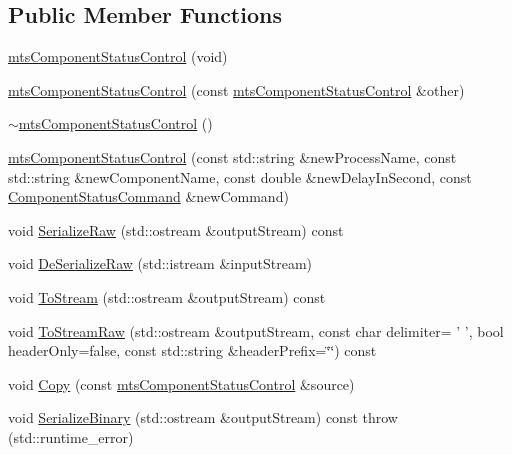 \subsection*{Public Member Functions}
\begin{DoxyCompactItemize}
\item 
\hyperlink{classmts_component_status_control_a4a0eb4df876169e6dbdd0d822362d8fe}{mts\-Component\-Status\-Control} (void)
\item 
\hyperlink{classmts_component_status_control_a1b81428cfe551fc765f40b0081424f1a}{mts\-Component\-Status\-Control} (const \hyperlink{classmts_component_status_control}{mts\-Component\-Status\-Control} \&other)
\item 
\hyperlink{classmts_component_status_control_a326a6e23cf95c0be12787c2400fd63a8}{$\sim$mts\-Component\-Status\-Control} ()
\item 
\hyperlink{classmts_component_status_control_abae2a8ef219b86843c51a5420e12fe4b}{mts\-Component\-Status\-Control} (const std\-::string \&new\-Process\-Name, const std\-::string \&new\-Component\-Name, const double \&new\-Delay\-In\-Second, const \hyperlink{classmts_component_status_control_aaa1cc592d13ddd45a5cf695f72d3511f}{Component\-Status\-Command} \&new\-Command)
\item 
void \hyperlink{classmts_component_status_control_a08061e2b13e950ad1808c52ca9d2b6eb}{Serialize\-Raw} (std\-::ostream \&output\-Stream) const 
\item 
void \hyperlink{classmts_component_status_control_a6b3b0363d79317544aa2e24106b65c74}{De\-Serialize\-Raw} (std\-::istream \&input\-Stream)
\item 
void \hyperlink{classmts_component_status_control_a203ad251c8d802a2528587accdccd47b}{To\-Stream} (std\-::ostream \&output\-Stream) const 
\item 
void \hyperlink{classmts_component_status_control_a2aaf608f7b087a267a29930951bdd1e9}{To\-Stream\-Raw} (std\-::ostream \&output\-Stream, const char delimiter= ' ', bool header\-Only=false, const std\-::string \&header\-Prefix=\char`\"{}\char`\"{}) const 
\item 
void \hyperlink{classmts_component_status_control_a4f0fff86345f1b1c83564a9de812d4d3}{Copy} (const \hyperlink{classmts_component_status_control}{mts\-Component\-Status\-Control} \&source)
\item 
void \hyperlink{classmts_component_status_control_ab583cb42c8fdaa82b88bb7e33dff8dd7}{Serialize\-Binary} (std\-::ostream \&output\-Stream) const   throw (std\-::runtime\-\_\-error)
\item 

\end{DoxyCompactItemize}
